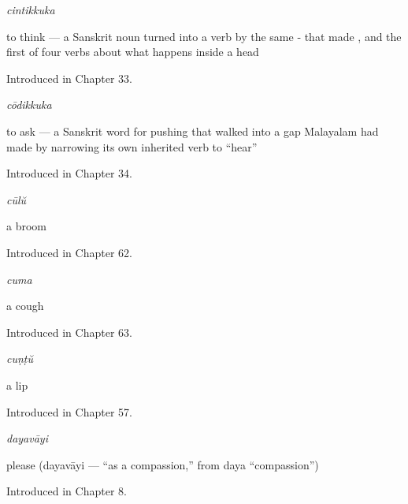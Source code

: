 \noindent\begin{minipage}[t]{\linewidth}
\raggedright
\textbf{}\enspace\emph{cintikkuka}\par
\small to think — a Sanskrit noun turned into a verb by the same ‑ that made , and the first of four verbs about what happens inside a head\par
\footnotesize Introduced in Chapter 33.
\end{minipage}\par\medskip

\noindent\begin{minipage}[t]{\linewidth}
\raggedright
\textbf{}\enspace\emph{cōdikkuka}\par
\small to ask — a Sanskrit word for pushing that walked into a gap Malayalam had made by narrowing its own inherited verb to \textquotedblleft{}hear\textquotedblright{}\par
\footnotesize Introduced in Chapter 34.
\end{minipage}\par\medskip

\noindent\begin{minipage}[t]{\linewidth}
\raggedright
\textbf{}\enspace\emph{cūlŭ}\par
\small a broom\par
\footnotesize Introduced in Chapter 62.
\end{minipage}\par\medskip

\noindent\begin{minipage}[t]{\linewidth}
\raggedright
\textbf{}\enspace\emph{cuma}\par
\small a cough\par
\footnotesize Introduced in Chapter 63.
\end{minipage}\par\medskip

\noindent\begin{minipage}[t]{\linewidth}
\raggedright
\textbf{}\enspace\emph{cuṇṭŭ}\par
\small a lip\par
\footnotesize Introduced in Chapter 57.
\end{minipage}\par\medskip

\noindent\begin{minipage}[t]{\linewidth}
\raggedright
\textbf{}\enspace\emph{dayavāyi}\par
\small please (dayavāyi — \textquotedblleft{}as a compassion,\textquotedblright{} from  daya \textquotedblleft{}compassion\textquotedblright{})\par
\footnotesize Introduced in Chapter 8.
\end{minipage}\par\medskip

